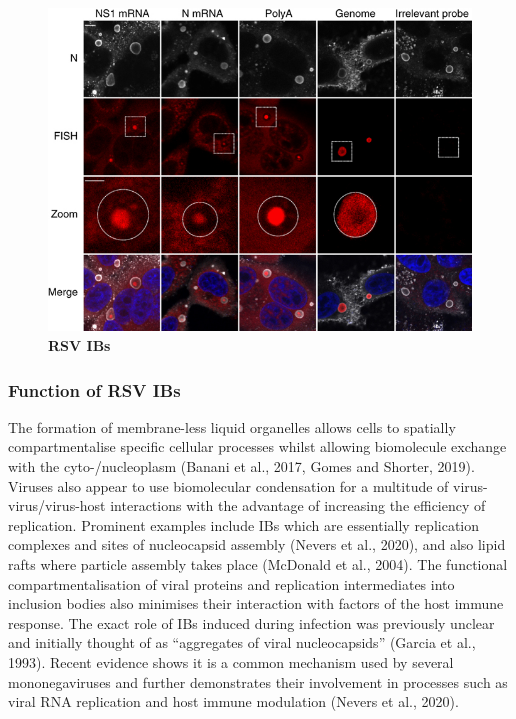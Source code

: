 \begin{figure}
    \centering
    \includegraphics[width=1\linewidth]{04. Introduction/Figs/11. RSV IBs.png}  
    \caption[RSV IBs]{\textbf{RSV IBs} }
    \label{fig:RSV IBs}
\end{figure}

\subsubsection{Function of RSV IBs} \label{Function of RSV IBs}
The formation of membrane-less liquid organelles allows cells to spatially compartmentalise specific cellular processes whilst allowing biomolecule exchange with the cyto-/nucleoplasm (Banani et al., 2017, Gomes and Shorter, 2019). Viruses also appear to use biomolecular condensation for a multitude of virus-virus/virus-host interactions with the advantage of increasing the efficiency of replication. Prominent examples include IBs which are essentially replication complexes and sites of nucleocapsid assembly (Nevers et al., 2020), and also lipid rafts where particle assembly takes place (McDonald et al., 2004). The functional compartmentalisation of viral proteins and replication intermediates into inclusion bodies also minimises their interaction with factors of the host immune response. The exact role of IBs induced during infection was previously unclear and initially thought of as “aggregates of viral nucleocapsids” (Garcia et al., 1993). Recent evidence shows it is a common mechanism used by several mononegaviruses and further demonstrates their involvement in processes such as viral RNA replication and host immune modulation (Nevers et al., 2020).

